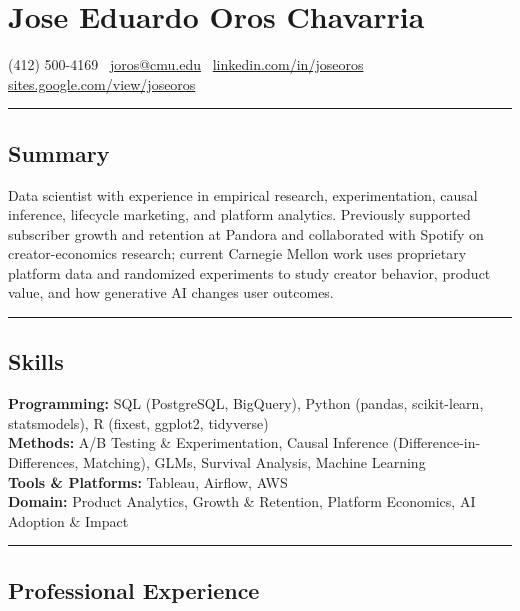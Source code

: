 \documentclass[10pt,letterpaper]{article}
\newcommand{\name}[1]{\section*{#1}}
\newcommand{\sep}{{\color{gray}\,\textbullet\,\,}}
\newcommand{\hsep}{\noindent\textcolor{gray}{\rule{\textwidth}{0.5pt}}}
\newcommand{\block}[1]{\begin{samepage}\hsep\subsection*{#1}\end{samepage}}
\begin{document}
\name{Jose Eduardo Oros Chavarria}

\begin{center}
(412) 500-4169 \sep \href{mailto:joros@cmu.edu}{joros@cmu.edu} \sep \href{https://www.linkedin.com/in/joseoros}{linkedin.com/in/joseoros} \sep \href{https://sites.google.com/view/joseoros}{sites.google.com/view/joseoros}
\end{center}

\block{Summary}

\noindent Data scientist with experience in empirical research, experimentation, causal inference, lifecycle marketing, and platform analytics. Previously supported subscriber growth and retention at Pandora and collaborated with Spotify on creator-economics research; current Carnegie Mellon work uses proprietary platform data and randomized experiments to study creator behavior, product value, and how generative AI changes user outcomes.

\block{Skills}

\noindent\textbf{Programming:} SQL (PostgreSQL, BigQuery), Python (pandas, scikit-learn, statsmodels), R (fixest, ggplot2, tidyverse) \\
\textbf{Methods:} A/B Testing \& Experimentation, Causal Inference (Difference-in-Differences, Matching), GLMs, Survival Analysis, Machine Learning \\
\textbf{Tools \& Platforms:} Tableau, Airflow, AWS \\
\textbf{Domain:} Product Analytics, Growth \& Retention, Platform Economics, AI Adoption \& Impact

\block{Professional Experience}
\end{document}
